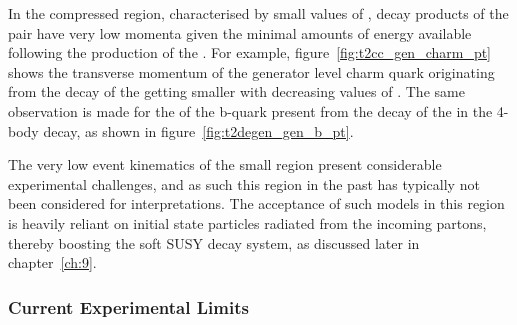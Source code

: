 In the compressed region, characterised by small values of \deltam, decay
products of the \sTop pair have very low momenta given the minimal amounts of
energy available following the production of the \chiz. For example, 
figure~\ref{fig:t2cc_gen_charm_pt} shows the transverse momentum of the
generator level charm quark originating from the decay of the \sTop getting
smaller
with decreasing values of \deltam. The same observation is made for the \Pt of
the b-quark present from the decay of the \sTop in the 4-body decay, as shown in
figure~\ref{fig:t2degen_gen_b_pt}.

The very low event kinematics of the small \deltam region present considerable
experimental challenges, and as such this region in the past has typically not
been considered for interpretations. The acceptance of such models in this
region is heavily reliant on initial state particles radiated from the
incoming partons, thereby boosting the soft SUSY decay system, as discussed
later in chapter~\ref{ch:9}.

\subsubsection{Current Experimental Limits}

